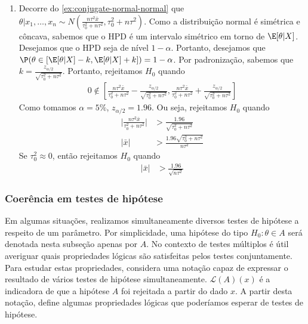 {\begin{enumerate}[label=(\alph*)]
  \item Decorre do 
  \cref{ex:conjugate-normal-normal} que 
  $\theta|x_{1},\ldots,x_{n} \sim N\left(\frac{n\tau^{2}\bar{x}}{\tau_{0}^{2}+n\tau^{2}},\tau_{0}^{2}+n\tau^{2}\right)$.
  Como a distribuição normal é simétrica e côncava,
  sabemos que o HPD é um intervalo simétrico 
  em torno de $\E[\theta|X]$.
  Desejamos que o HPD seja de nível $1-\alpha$.
  Portanto, desejamos que 
  $\P(\theta \in [\E[\theta|X]-k,\E[\theta|X]+k]) = 1-\alpha$.
  Por padronização, sabemos que 
  $k = \frac{z_{\alpha/2}}{\sqrt{\tau_{0}^{2}+n\tau^{2}}}$.
  Portanto, rejeitamos $H_{0}$ quando
  \begin{align*}
   0 \notin 
   \left[\frac{n\tau^{2}\bar{x}}{\tau_{0}^{2}+n\tau^{2}}-\frac{z_{\alpha/2}}{\sqrt{\tau_{0}^{2}+n\tau^{2}}},
   \frac{n\tau^{2}\bar{x}}{\tau_{0}^{2}+n\tau^{2}}+\frac{z_{\alpha/2}}{\sqrt{\tau_{0}^{2}+n\tau^{2}}}\right]
  \end{align*}
  Como tomamos $\alpha=5\%$, $z_{\alpha/2} = 1.96$. 
  Ou seja, rejeitamos $H_{0}$ quando
  \begin{align*}
   \bigg|\frac{n\tau^{2}\bar{x}}
   {\tau_{0}^{2}+n\tau^{2}}\bigg| 
   &> \frac{1.96}{\sqrt{\tau_{0}^{2}+n\tau^{2}}} \\
   |\bar{x}|
   &> \frac{1.96\sqrt{\tau_{0}^{2}+n\tau^{2}}}
   {n\tau^{2}}
  \end{align*}
  Se $\tau_{0}^{2} \approx 0$, 
  então rejeitamos $H_{0}$ quando
  \begin{align*}
   |\bar{x}|
   &> \frac{1.96}{\sqrt{n\tau^{2}}}
  \end{align*}
 \end{enumerate}
}{}

\subsubsection{Coerência em testes de hipótese}
Em algumas situações,
realizamos simultaneamente diversos 
testes de hipótese a respeito de um parâmetro.
Por simplicidade, uma hipótese do tipo 
$H_{0}: \theta \in A$ será denotada
nesta subseção apenas por $A$.
No contexto de testes múltiplos é 
útil averiguar quais propriedades lógicas são
satisfeitas pelos testes conjuntamente.
Para estudar estas propriedades, 
\citet{Izbicki2015} considera uma 
notação capaz de expressar o resultado de 
vários testes de hipótese simultaneamente.
$\mathcal{L}(A)(x)$ é a indicadora de que 
a hipótese $A$ foi rejeitada a partir do dado $x$.
A partir desta notação, \citet{Izbicki2015} define algumas propriedades lógicas que 
poderíamos esperar de testes de hipótese.

